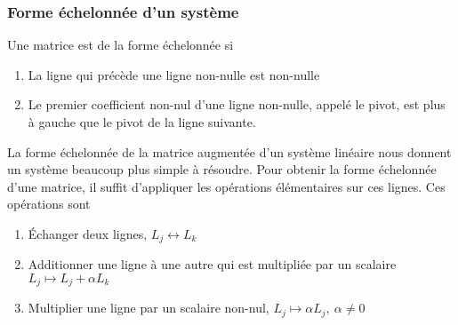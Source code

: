 \subsubsection{Forme échelonnée d'un système}
\begin{definition}
    Une matrice est de la forme échelonnée si \begin{enumerate}
        \item La ligne qui précède une ligne non-nulle est non-nulle
        \item Le premier coefficient non-nul d'une ligne non-nulle, appelé le pivot, est plus à
              gauche que le pivot de la ligne suivante.
    \end{enumerate}
\end{definition}
La forme échelonnée de la matrice augmentée d'un système linéaire nous donnent un système beaucoup plus simple à résoudre. Pour obtenir la forme échelonnée d'une matrice,
il suffit d'appliquer les opérations élémentaires sur ces lignes. Ces opérations sont \begin{enumerate}
    \item Échanger deux lignes, $L_j \leftrightarrow L_k$
    \item Additionner une ligne à une autre qui est multipliée par un scalaire $L_j \mapsto L_j + \alpha L_k$
    \item Multiplier une ligne par un scalaire non-nul, $L_j \mapsto \alpha L_j, \ \alpha \neq 0$
\end{enumerate}

